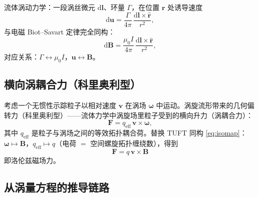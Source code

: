 \documentclass[11pt,a4paper]{article}
\newcommand{\dd}{\mathrm{d}}
\newcommand{\bu}{\bm{u}}
\newcommand{\bom}{\bm{\omega}}
\newcommand{\bF}{\bm{F}}
\newcommand{\br}{\bm{r}}
\newcommand{\bB}{\bm{B}}
\newcommand{\bv}{\bm{v}}
\newcommand{\bl}{\bm{l}}
\theoremstyle{remark}
\begin{document}
流体涡动力学：一段涡丝微元 $\dd\bl$、环量 $\Gamma$，在位置 $\br$ 处诱导速度
\begin{equation}
\label{eq:bsfluid}
\dd\bu=\frac{\Gamma}{4\pi}\,\frac{\dd\bl\times\hat{\br}}{r^{2}},
\end{equation}
与电磁 Biot--Savart 定律完全同构：
\begin{equation}
\label{eq:bsem}
\dd\bB=\frac{\mu_{0}I}{4\pi}\,\frac{\dd\bl\times\hat{\br}}{r^{2}},
\end{equation}
对应关系：$\Gamma\leftrightarrow\mu_{0}I$，$\bu\leftrightarrow\bB$。

\subsection{横向涡耦合力（科里奥利型）}

考虑一个无惯性示踪粒子以相对速度 $\bv$ 在涡场 $\bom$ 中运动。涡旋流形带来的几何偏转力（科里奥利型）——流体力学中涡旋场里粒子受到的横向升力（涡耦合力）：
\begin{equation}
\label{eq:effforce}
\bF=q_{\mathrm{eff}}\,\bv\times\bom,
\end{equation}
其中 $q_{\mathrm{eff}}$ 是粒子与涡场之间的等效拓扑耦合荷。替换 TUFT 同构 \eqref{eq:isomap}：$\bom\mapsto\bB$，$q_{\mathrm{eff}}\mapsto q$（电荷 $=$ 空间螺旋拓扑缠绕数），得到
\begin{equation}
\label{eq:lorentz}
\boxed{\ \bF=q\,\bv\times\bB\ }
\end{equation}
即洛伦兹磁场力。

\subsection{从涡量方程的推导链路}
\end{document}
